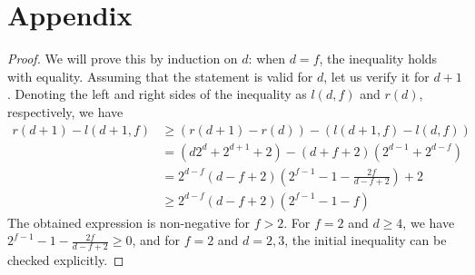 \appendix

\section{Appendix}\label{appendix}

\dfInequality*
\begin{proof}
    We will prove this by induction on $d$: when $d=f$, the inequality holds with equality. Assuming that the statement is valid for $d$, let us verify it for  $d+1$. Denoting the left and right sides of the inequality as $l(d, f)$ and $r(d)$, respectively, we have
    \begin{equation*}
        \begin{split}
            r(d+1) - l(d+1, f) 
            & \geq \left(r(d+1) - r(d)\right) - \left(l(d+1, f) - l(d, f)\right) \\
            & = \left(d2^d + 2^{d+1} + 2\right) - \left(d+f+2\right)\left(2^{d-1}+2^{d-f}\right) \\
            & = 2^{d-f}\left(d-f+2\right)\left(2^{f-1}-1-\frac{2f}{d-f+2}\right)+2 \\
            & \geq 2^{d-f}\left(d-f+2\right)\left(2^{f-1}-1-f\right)
        \end{split}
    \end{equation*}
    The obtained expression is non-negative for $f>2$. For $f=2$ and $d\geq4$, we have $2^{f-1}-1-\frac{2f}{d-f+2}\geq0$, and for $f=2$ and $d=2,3$, the initial inequality can be checked explicitly.    
\end{proof}

